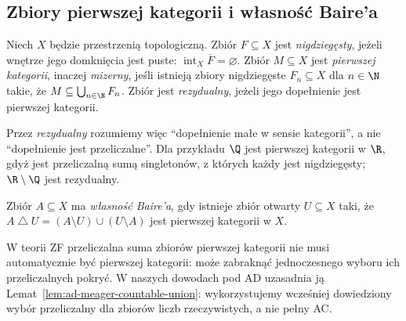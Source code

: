 \subsection{Zbiory pierwszej kategorii i własność Baire'a}
\begin{definicja}
\label{def:ad-meager}
Niech $X$ będzie przestrzenią topologiczną.
Zbiór $F\subseteq X$ jest \emph{nigdziegęsty}, jeżeli
wnętrze jego domknięcia jest puste:
$\operatorname{int}_X\overline F=\varnothing$.
Zbiór $M\subseteq X$ jest \emph{pierwszej kategorii},
inaczej \emph{mizerny}, jeśli istnieją zbiory nigdziegęste
$F_n\subseteq X$ dla $n\in\N$ takie, że
$M\subseteq\bigcup_{n\in\N}F_n$.
Zbiór jest \emph{rezydualny},
jeżeli jego dopełnienie jest pierwszej kategorii.
\end{definicja}
Przez \emph{rezydualny} rozumiemy więc ``dopełnienie małe
w sensie kategorii'', a nie ``dopełnienie jest przeliczalne''.
Dla przykładu $\Q$ jest pierwszej kategorii w $\R$,
gdyż jest przeliczalną sumą singletonów, z których każdy
jest nigdziegęsty; $\R\setminus\Q$ jest rezydualny.

\begin{definicja}
\label{def:ad-baire-property}
Zbiór $A\subseteq X$ ma \emph{własność Baire'a}, gdy
istnieje zbiór otwarty $U\subseteq X$ taki, że
$A\mathbin{\triangle}U=(A\setminus U)\cup(U\setminus A)$
jest pierwszej kategorii w $X$.
\end{definicja}
W teorii ZF przeliczalna suma zbiorów pierwszej kategorii
nie musi automatycznie być pierwszej kategorii: może
zabraknąć jednoczesnego wyboru ich przeliczalnych pokryć.
W naszych dowodach pod AD uzasadnia ją
Lemat~\ref{lem:ad-meager-countable-union}:
wykorzystujemy wcześniej dowiedziony
wybór przeliczalny dla zbiorów
liczb rzeczywistych, a nie pełny AC.


